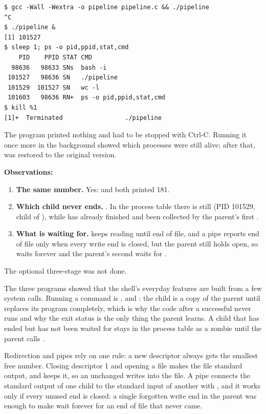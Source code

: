 \documentclass[11pt,a4paper]{article}
\begin{document}
\begin{lstlisting}[caption={The broken pipeline never ends}]
$ gcc -Wall -Wextra -o pipeline pipeline.c && ./pipeline
^C
$ ./pipeline &
[1] 101527
$ sleep 1; ps -o pid,ppid,stat,cmd
    PID    PPID STAT CMD
  98636   98633 SNs  bash -i
 101527   98636 SN   ./pipeline
 101529  101527 SN   wc -l
 101603   98636 RN+  ps -o pid,ppid,stat,cmd
$ kill %1
[1]+  Terminated                 ./pipeline
\end{lstlisting}

The program printed nothing and had to be stopped with Ctrl-C. Running it once more in the
background showed which processes were still alive; after that,  was restored
to the original version.

\textbf{Observations:}
\begin{enumerate}
  \item \textbf{The same number.} Yes:  and  both
  printed 181.
  \item \textbf{Which child never ends.} . In the process table there is still
   (PID 101529, child of ), while  has already finished
  and been collected by the parent's first .
  \item \textbf{What  is waiting for.}  keeps reading until end of file, and
  a pipe reports end of file only when every write end is closed, but the parent still holds
   open, so  waits forever and the parent's second  waits for
  .
\end{enumerate}

The optional three-stage  was not done.


The three programs showed that the shell's everyday features are built from a few system calls.
Running a command is ,  and : the child is a copy of the parent
until  replaces its program completely, which is why the code after a successful
 never runs and why the exit status is the only thing the parent learns. A child that
has ended but has not been waited for stays in the process table as a zombie until the parent
calls .

Redirection and pipes rely on one rule: a new descriptor always gets the smallest free number.
Closing descriptor 1 and opening a file makes the file standard output, and  keeps it,
so an unchanged  writes into the file. A pipe connects the standard output of one child
to the standard input of another with , and it works only if every unused end is
closed: a single forgotten write end in the parent was enough to make  wait forever for
an end of file that never came.
\end{document}
